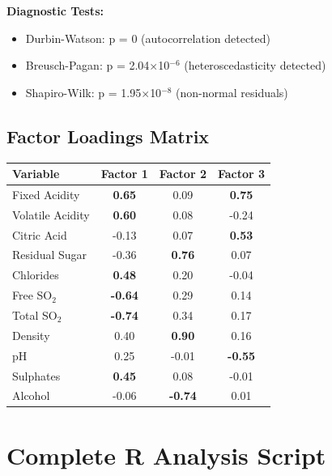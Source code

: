 \textbf{Diagnostic Tests:}
\begin{itemize}
\item Durbin-Watson: p = 0 (autocorrelation detected)
\item Breusch-Pagan: p = 2.04$\times$10$^{-6}$ (heteroscedasticity detected)
\item Shapiro-Wilk: p = 1.95$\times$10$^{-8}$ (non-normal residuals)
\end{itemize}

\section{Factor Loadings Matrix}
\begin{longtable}{|l|c|c|c|}
\hline
\textbf{Variable} & \textbf{Factor 1} & \textbf{Factor 2} & \textbf{Factor 3} \\
\hline
Fixed Acidity & \textbf{0.65} & 0.09 & \textbf{0.75} \\
\hline
Volatile Acidity & \textbf{0.60} & 0.08 & -0.24 \\
\hline
Citric Acid & -0.13 & 0.07 & \textbf{0.53} \\
\hline
Residual Sugar & -0.36 & \textbf{0.76} & 0.07 \\
\hline
Chlorides & \textbf{0.48} & 0.20 & -0.04 \\
\hline
Free SO$_2$ & \textbf{-0.64} & 0.29 & 0.14 \\
\hline
Total SO$_2$ & \textbf{-0.74} & 0.34 & 0.17 \\
\hline
Density & 0.40 & \textbf{0.90} & 0.16 \\
\hline
pH & 0.25 & -0.01 & \textbf{-0.55} \\
\hline
Sulphates & \textbf{0.45} & 0.08 & -0.01 \\
\hline
Alcohol & -0.06 & \textbf{-0.74} & 0.01 \\
\hline
\end{longtable}

\chapter{Complete R Analysis Script}

